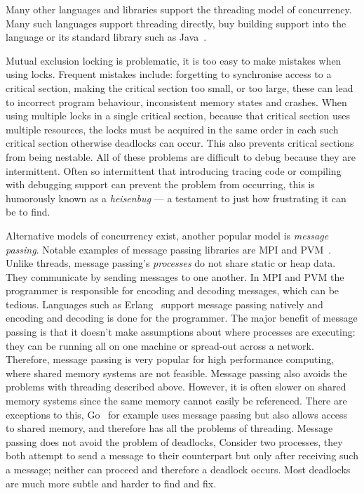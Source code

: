Many other languages and libraries support the threading model of concurrency.
Many such languages support threading directly, buy building support into the
language or its standard library such as Java~\cite{java-threads}.

Mutual exclusion locking is problematic,
it is too easy to make mistakes when using locks.
Frequent mistakes include: forgetting to synchronise access to a critical
section,
making the critical section too small, or too large,
these can lead to incorrect program behaviour, inconsistent memory states and
crashes. 
When using multiple locks in a single critical section,
because that critical section uses multiple resources,
the locks must be acquired in the same order in each such critical section
otherwise deadlocks can occur.
This also prevents critical sections from being nestable.
All of these problems are difficult to debug because they are intermittent.
Often so intermittent that introducing tracing code or compiling with debugging
support can prevent the problem from occurring,
this is humorously known as a \emph{heisenbug} ---
a testament to just how frustrating it can be to find.

Alternative models of concurrency exist,
another popular model is \emph{message passing}.
Notable examples of message passing libraries are MPI\cite{mpi} and
PVM~\cite{pvm}.
Unlike threads, message passing's \emph{processes} do not share static or heap data.
They communicate by sending messages to one another.
In MPI and PVM the programmer is responsible for encoding and decoding messages,
which can be tedious.
Languages such as Erlang~\cite{erlang} support message passing natively and
encoding and decoding is done for the programmer.
The major benefit of message passing is that it doesn't make assumptions about where processes
are executing:
they can be running all on one machine or spread-out across a network.
Therefore, message passing is very popular for high performance computing,
where shared memory systems are not feasible.
Message passing also avoids the problems with threading described above.
However,
it is often slower on shared memory systems since the same memory cannot easily
be referenced.
There are exceptions to this,
Go~\cite{go} for example uses message passing but also allows access to shared
memory,
and therefore has all the problems of threading.
Message passing does not avoid the problem of deadlocks,
Consider two processes,
they both attempt to send a message to their counterpart but only after
receiving such a message;
neither can proceed and therefore a deadlock occurs.
Most deadlocks are much more subtle and harder to find and fix.

